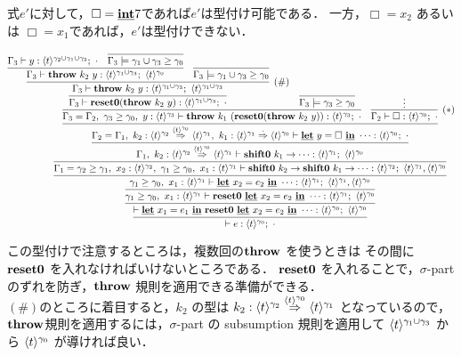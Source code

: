 式$e'$に対して，$\Box=\underline{\textbf{int}}7$であれば$e'$は型付け可能である．
一方，$\Box=x_2$ あるいは $\Box=x_1$であれば，$e'$は型付けできない．

\def\proofone{
  \infer
  {\vdash e:\tzero;~\cdot{}}
  {
    \infer{\vdash \cLet~x_1=e_1~\cIn~\Resetz~\cLet~x_2=e_2~\cIn~\cdots :
      \tzero;~\tzero
    }
    {\infer{\longer{\gamma_1}{\gamma_0},~x_1:\tone \vdash
        \Resetz~\cLet~x_2=e_2~\cIn~\cdots : \tone;~\tzero
      }
      {\prooftwo}
    }
  }
}
\def\prooftwo{
  \infer{\longer{\gamma_1}{\gamma_0},~x_1:\tone \vdash
    \cLet~x_2=e_2~\cIn~\cdots : \tone;~\tone,\tzero}
  {\infer{\Gamma_1=\longer{\gamma_2}{\gamma_1},~x_2:\ttwo,~\longer{\gamma_1}{\gamma_0},~x_1:\tone \vdash
      \shiftz{k_2}{\shiftz{k_1}{\cdots}} : \ttwo;~\tone,\tzero
    }
    {\proofthree}
  }
}

\def\proofthree{
  \infer{\Gamma_1,~k_2:\contT{\ttwo}{\tone}{\tzero}
    \vdash \shiftz{k_1}{\cdots} : \tone;~ \tzero
  }
  {\infer{\Gamma_2=\Gamma_1,~k_2:\contT{\ttwo}{\tone}{\tzero},
      ~k_1:\contT{\tone}{\tzero}{\cdot{}}
      \vdash \cLet~ y=\Box~ \cIn~\cdots : \tzero;~\cdot{}
    }
    {\prooffour}
  }
}

\def\prooffour{
  \infer{\Gamma_3=\Gamma_2,~\longer{\gamma_3}{\gamma_0},~y:\tthree \vdash \throw{k_1}{(\Resetz(\throw{k_2}{y}))} : \tthree;~\cdot{}}
  {\prooffive}
  & \infer[(*)]{\Gamma_2 \vdash \Box : \tzero;~ \cdot}{\vdots}
}

\def\prooffive{
  \infer
  {\Gamma_3 \vdash \Resetz(\throw{k_2}{y}) : \tonethree; ~\cdot{}}
  {\infer[(\#)]
    {\Gamma_3 \vdash \throw{k_2}{y} : \tonethree;~\tonethree}
    {\infer
      {\Gamma_3 \vdash \throw{k_2}{y} : \tonethree;~\tzero}
      {\Gamma_3 \vdash y :
        \codeT{t}{\gamma_2\uni\gamma_1\uni\gamma_3};~\cdot
        & \infer{\Gamma_3 \models
          \longer{\gamma_1\uni\gamma_3}{\gamma_0}}{}
      }
      & \infer{\Gamma_3 \models \longer{\gamma_1\uni\gamma_3}{\gamma_0}}{}
    }
  }
  & \infer{\Gamma_3 \models \longer{\gamma_3}{\gamma_0}}{}
}

\[
  \proofone
\]

この型付けで注意するところは，複数回の$\textbf{throw}$ を使うときは その間に $\textbf{reset0}$ を入れなければいけないところである．
$\textbf{reset0}$ を入れることで，$\sigma$-part のずれを防ぎ，$\textbf{throw}$ 規則を適用できる準備ができる．\\
$(\#)$のところに着目すると，$k_2$ の型は $k_2:{\langle{t}\rangle^{\gamma_2}} \stackrel{\langle{t}\rangle^{\gamma_0}}{\Rightarrow} {\langle{t}\rangle^{\gamma_1}}$ となっているので，$\textbf{throw}$規則を適用するには，$\sigma$-part の subsumption 規則を適用して $\langle{t}\rangle^{\gamma_1\cup\gamma_3}$ から $\langle{t}\rangle^{\gamma_0}$ が導ければ良い．

